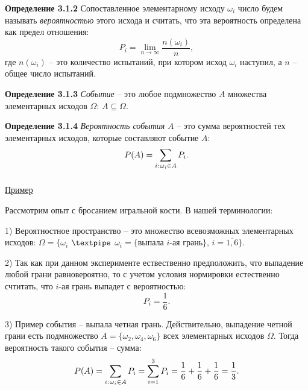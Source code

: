 \documentclass[12pt,a4paper]{article}
\begin{document}
\textbf{Определение 3.1.2} 
Сопоставленное элементарному исходу $\omega_i$ число будем называть \textit{вероятностью} этого исхода и считать, что эта вероятность определена как предел отношения:
\[ P_i = \lim_{n \to \infty} \frac{n(\omega_i)}{n},\]
где $n(\omega_i)$ -- это количество испытаний, при котором исход $\omega_i$ наступил, а $n$ --  общее число испытаний.

\textbf{Определение 3.1.3}
\textit{Событие} -- это любое подмножество $A$ множества элементарных исходов $\Omega$: $A \subseteq \Omega$. 

\textbf{Определение 3.1.4}
\textit{Вероятность события} $A$ -- это сумма вероятностей тех элементарных исходов, которые составляют событие $A$:
\[P(A) = \sum_{i: \hspace{1px} \omega_i \in A} P_i. \]

\subparagraph{}
\underline{Пример}

Рассмотрим опыт с бросанием игральной кости. В нашей терминологии:

1) Вероятностное пространство -- это множество всевозможных элементарных исходов: $\Omega = \{ \omega_i $ $\textpipe$  $\omega_i = \{$выпала $i$-ая грань$\}$, $i = \overline{1, 6} \}$.

2) Так как при данном эксперименте ествественно предположить, что выпадение любой грани равновероятно, то с учетом условия нормировки естественно счтитать, что $i$-ая грань выпадет с вероятностью:
\[P_i = \frac{1}{6}.\]

3) Пример события -- выпала четная грань. Действительно, выпадение четной грани есть подмножество     $A = \{\omega_2, \omega_4, \omega_6 \}$ всех элементарных исходов $\Omega$. Тогда вероятность такого события -- сумма:
\[P(A) = \sum_{i: \hspace{1px} \omega_i \in A} P_i = \sum_{i = 1}^3 P_i = \frac{1}{6} + \frac{1}{6} + \frac{1}{6} = \frac{1}{3}. \]
\end{document}
